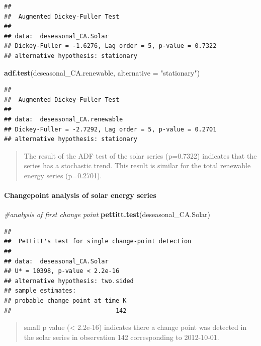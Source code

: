 \documentclass[12pt,]{article}
\newenvironment{Shaded}{\begin{snugshade}}{\end{snugshade}}
\newcommand{\KeywordTok}[1]{\textcolor[rgb]{0.13,0.29,0.53}{\textbf{#1}}}
\newcommand{\DataTypeTok}[1]{\textcolor[rgb]{0.13,0.29,0.53}{#1}}
\newcommand{\StringTok}[1]{\textcolor[rgb]{0.31,0.60,0.02}{#1}}
\newcommand{\CommentTok}[1]{\textcolor[rgb]{0.56,0.35,0.01}{\textit{#1}}}
\newcommand{\NormalTok}[1]{#1}
\let\oldparagraph\paragraph
\renewcommand{\paragraph}[1]{\oldparagraph{#1}\mbox{}}
\begin{document}
\begin{verbatim}
## 
##  Augmented Dickey-Fuller Test
## 
## data:  deseasonal_CA.Solar
## Dickey-Fuller = -1.6276, Lag order = 5, p-value = 0.7322
## alternative hypothesis: stationary
\end{verbatim}

\begin{Shaded}
\begin{Highlighting}[]
\KeywordTok{adf.test}\NormalTok{(deseasonal_CA.renewable, }\DataTypeTok{alternative =} \StringTok{"stationary"}\NormalTok{)}
\end{Highlighting}
\end{Shaded}

\begin{verbatim}
## 
##  Augmented Dickey-Fuller Test
## 
## data:  deseasonal_CA.renewable
## Dickey-Fuller = -2.7292, Lag order = 5, p-value = 0.2701
## alternative hypothesis: stationary
\end{verbatim}

\begin{quote}
The result of the ADF test of the solar series (p=0.7322) indicates that
the series has a stochastic trend. This result is similar for the total
renewable energy series (p=0.2701).
\end{quote}

\paragraph{Changepoint analysis of solar energy
series}\label{changepoint-analysis-of-solar-energy-series}

\begin{Shaded}
\begin{Highlighting}[]
\CommentTok{#analysis of first change point}
\KeywordTok{pettitt.test}\NormalTok{(deseasonal_CA.Solar)}
\end{Highlighting}
\end{Shaded}

\begin{verbatim}
## 
##  Pettitt's test for single change-point detection
## 
## data:  deseasonal_CA.Solar
## U* = 10398, p-value < 2.2e-16
## alternative hypothesis: two.sided
## sample estimates:
## probable change point at time K 
##                             142
\end{verbatim}

\begin{quote}
small p value (\textless{} 2.2e-16) indicates there a change point was
detected in the solar series in observation 142 corresponding to
2012-10-01.
\end{quote}
\end{document}
